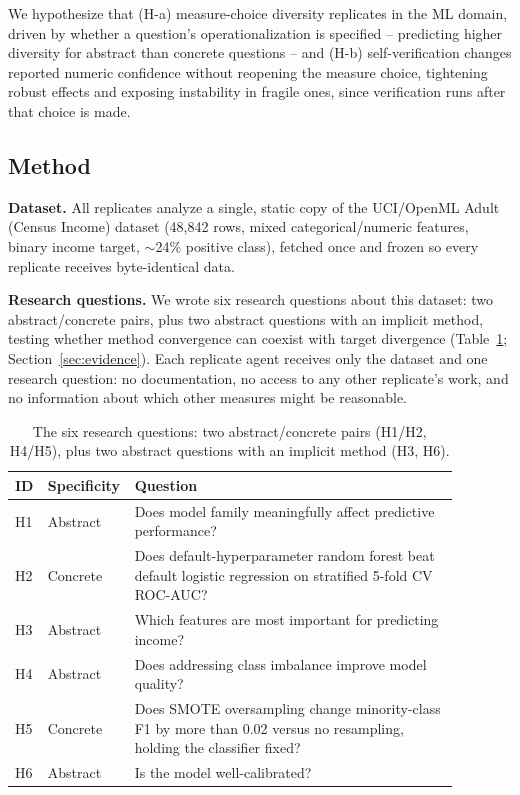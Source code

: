 \documentclass{article}
\begin{document}
We hypothesize that (H-a) measure-choice diversity replicates in the ML domain, driven by
whether a question's operationalization is specified -- predicting higher diversity for
abstract than concrete questions -- and (H-b) self-verification changes reported numeric
confidence without reopening the measure choice, tightening robust effects and exposing
instability in fragile ones, since verification runs after that choice is made.

\subsection{Method}

\textbf{Dataset.} All replicates analyze a single, static copy of the UCI/OpenML Adult
(Census Income) dataset \citep{beckerkohavi1996} (48{,}842 rows, mixed categorical/numeric
features, binary income target, ${\sim}$24\% positive class), fetched once and frozen so
every replicate receives byte-identical data.

\textbf{Research questions.} We wrote six research questions about this dataset: two
abstract/concrete pairs, plus two abstract questions with an implicit method, testing
whether method convergence can coexist with target divergence
(Table~\ref{tab:hypotheses}; Section~\ref{sec:evidence}). Each replicate agent
receives only the dataset and one research question: no documentation, no access to any
other replicate's work, and no information about which other measures might be
reasonable.

\begin{table}[h]
  \caption{The six research questions: two abstract/concrete pairs (H1/H2, H4/H5), plus
  two abstract questions with an implicit method (H3, H6).}
  \label{tab:hypotheses}
  \centering
  \small
  \begin{tabular}{p{0.04\linewidth}p{0.12\linewidth}p{0.72\linewidth}}
    \toprule
    ID & Specificity & Question \\
    \midrule
    H1 & Abstract & Does model family meaningfully affect predictive performance? \\
    H2 & Concrete & Does default-hyperparameter random forest beat default logistic
    regression on stratified 5-fold CV ROC-AUC? \\
    H3 & Abstract & Which features are most important for predicting income? \\
    H4 & Abstract & Does addressing class imbalance improve model quality? \\
    H5 & Concrete & Does SMOTE oversampling change minority-class F1 by more than 0.02
    versus no resampling, holding the classifier fixed? \\
    H6 & Abstract & Is the model well-calibrated? \\
    \bottomrule
  \end{tabular}
\end{table}
\end{document}
